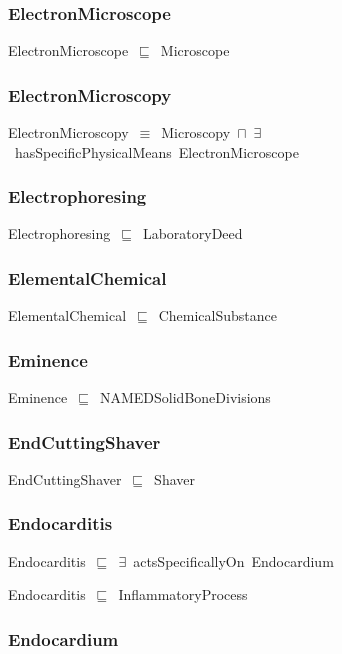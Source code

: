 \documentclass{article}
\begin{document}
\subsubsection*{ElectronMicroscope}

ElectronMicroscope~\ensuremath{\sqsubseteq}~Microscope~

\subsubsection*{ElectronMicroscopy}

ElectronMicroscopy~\ensuremath{\equiv}~Microscopy~\ensuremath{\sqcap}~\ensuremath{\exists}~hasSpecificPhysicalMeans~ElectronMicroscope

\subsubsection*{Electrophoresing}

Electrophoresing~\ensuremath{\sqsubseteq}~LaboratoryDeed~

\subsubsection*{ElementalChemical}

ElementalChemical~\ensuremath{\sqsubseteq}~ChemicalSubstance~

\subsubsection*{Eminence}

Eminence~\ensuremath{\sqsubseteq}~NAMEDSolidBoneDivisions~

\subsubsection*{EndCuttingShaver}

EndCuttingShaver~\ensuremath{\sqsubseteq}~Shaver~

\subsubsection*{Endocarditis}

Endocarditis~\ensuremath{\sqsubseteq}~\ensuremath{\exists}~actsSpecificallyOn~Endocardium~

Endocarditis~\ensuremath{\sqsubseteq}~InflammatoryProcess~

\subsubsection*{Endocardium}
\end{document}

